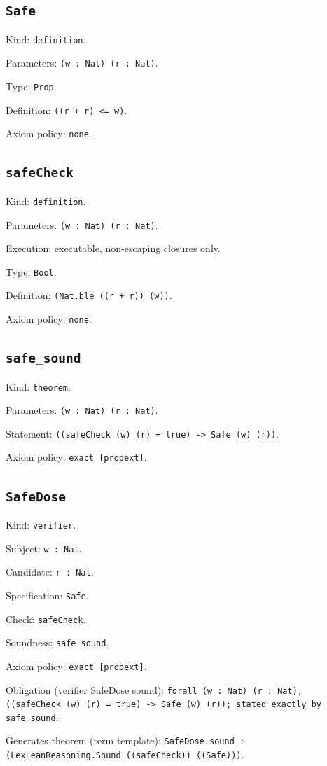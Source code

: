 \documentclass[11pt]{article}
\begin{document}
\subsection*{\texttt{Safe}}
\noindent Kind: \texttt{definition}.\par
\noindent Parameters: \texttt{(w : Nat) (r : Nat)}.\par
\noindent Type: \texttt{Prop}.\par
\noindent Definition: \texttt{((r + r) <= w)}.\par
\noindent Axiom policy: \texttt{none}.\par
\subsection*{\texttt{safeCheck}}
\noindent Kind: \texttt{definition}.\par
\noindent Parameters: \texttt{(w : Nat) (r : Nat)}.\par
\noindent Execution: executable, non-escaping closures only.\par
\noindent Type: \texttt{Bool}.\par
\noindent Definition: \texttt{(Nat.ble ((r + r)) (w))}.\par
\noindent Axiom policy: \texttt{none}.\par
\subsection*{\texttt{safe\_sound}}
\noindent Kind: \texttt{theorem}.\par
\noindent Parameters: \texttt{(w : Nat) (r : Nat)}.\par
\noindent Statement: \texttt{((safeCheck (w) (r) = true) -> Safe (w) (r))}.\par
\noindent Axiom policy: \texttt{exact [propext]}.\par
\subsection*{\texttt{SafeDose}}
\noindent Kind: \texttt{verifier}.\par
\noindent Subject: \texttt{w : Nat}.\par
\noindent Candidate: \texttt{r : Nat}.\par
\noindent Specification: \texttt{Safe}.\par
\noindent Check: \texttt{safeCheck}.\par
\noindent Soundness: \texttt{safe\_sound}.\par
\noindent Axiom policy: \texttt{exact [propext]}.\par
\noindent Obligation (verifier SafeDose sound): \texttt{forall (w : Nat) (r : Nat), ((safeCheck (w) (r) = true) -> Safe (w) (r)); stated exactly by safe\_sound}.\par
\noindent Generates theorem (term template): \texttt{SafeDose.sound : (LexLeanReasoning.Sound ((safeCheck)) ((Safe)))}.\par
\end{document}
